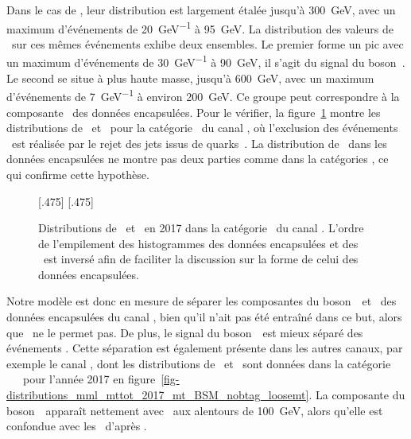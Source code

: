 Dans le cas de \mTtot,
leur distribution est 
largement étalée
jusqu'à \SI{300}{\GeV},
avec un maximum d'événements de \SI{20}{\GeV^{-1}} à \SI{95}{\GeV}.
La distribution des valeurs de \mml\ sur ces mêmes événements
exhibe deux ensembles.
Le premier forme un pic
avec un maximum d'événements de \SI{30}{\GeV^{-1}} à \SI{90}{\GeV},
il s'agit du signal du boson~\Zboson.
Le second se situe à plus haute masse,
jusqu'à \SI{600}{\GeV},
avec un maximum d'événements de \SI{7}{\GeV^{-1}} à environ \SI{200}{\GeV}.
Ce groupe peut correspondre à la composante \ttbar\ des données encapsulées.
Pour le vérifier, la figure~\ref{fig-distributions_mml_mttot_2017_tt_nobtag}
montre les distributions de \mTtot\ et \mml\ pour la catégorie \CATnobtag\ du canal \tauh\tauh,
où l'exclusion des événements \ttbar\ est réalisée par le rejet des jets issus de quarks~\quarkb.
La distribution de \mml\ dans les données encapsulées ne montre pas deux parties comme dans la catégories \CATbtag,
ce qui confirme cette hypothèse.
\begin{figure}[h]
\centering

[.475\textwidth]
{}
\hfill
{}[.475\textwidth]
{}

\caption[Distributions de \mTtot\ et \mml\ en 2017 dans la catégorie \CATnobtag\ du canal \tauh\tauh.]{Distributions de \mTtot\ et \mml\ en 2017 dans la catégorie \CATnobtag\ du canal \tauh\tauh. L'ordre de l'empilement des histogrammes des données encapsulées et des \ftauhs\ est inversé afin de faciliter la discussion sur la forme de celui des données encapsulées.}
\label{fig-distributions_mml_mttot_2017_tt_nobtag}
\end{figure}
\par
Notre modèle est donc en mesure de séparer les composantes du boson~\Zboson\ et \ttbar\ des données encapsulées du canal \tauh\tauh,
bien qu'il n'ait pas été entraîné dans ce but,
alors que \mTtot\ ne le permet pas.
De plus, le signal du boson~\Zboson\ est mieux séparé des événements \ftauhs.
Cette séparation est également présente dans les autres canaux, par exemple le canal \mu\tauh,
dont les distributions de \mTtot\ et \mml\ sont données dans la catégorie \CATbsm\ \CATnobtag\ \CATloosemt\ pour l'année 2017 en figure~\ref{fig-distributions_mml_mttot_2017_mt_BSM_nobtag_loosemt}.
La composante du boson~\Zboson\ apparaît nettement avec \mml\ aux alentours de \SI{100}{\GeV}, alors qu'elle est confondue avec les \ftauhs\ d'après \mTtot.
